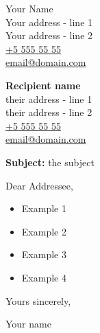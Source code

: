 \documentclass{letter}
\begin{document}
\begin{flushright}
Your Name\\
Your address - line 1\\
Your address - line 2\\
\href{tel:55555555}{+5 555 55 55}\\
\href{mailto:email@domain.com}{email@domain.com}
\end{flushright}

\vspace*{2\baselineskip}

\begin{flushleft}
\textbf{Recipient name}\\
their address - line 1\\
their address - line 2\\
\href{tel:55555555}{+5 555 55 55}\\
\href{mailto:email@domain.com}{email@domain.com}

\vspace*{4\baselineskip}

\textbf{Subject:} the subject 

\vspace*{2\baselineskip}

Dear Addressee,

\lipsum[1-2]
\begin{itemize}
	\item Example 1
	\item Example 2
	\item Example 3
	\item Example 4
\end{itemize}
\lipsum[4]

\vspace*{2\baselineskip}

Yours sincerely,

Your name

\end{flushleft}
\end{document}
